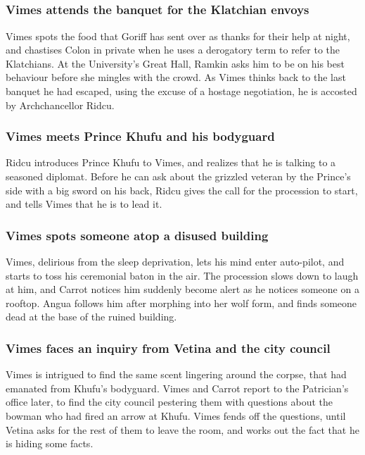 \subsection{}
\subsubsection{\Gls{Vimes} attends the banquet for the Klatchian envoys}
\Gls{Vimes} spots the food that \Gls{Goriff} has sent over as thanks for their help at night, and
chastises \Gls{Colon} in private when he uses a derogatory term to refer to the Klatchians. At the
University's Great Hall, \Gls{Ramkin} asks him to be on his best behaviour before she mingles with
the crowd. As \Gls{Vimes} thinks back to the last banquet he had escaped, using the excuse of a
hostage negotiation, he is accosted by Archchancellor \Gls{Ridcu}.

\subsubsection{\Gls{Vimes} meets Prince \Gls{Khufu} and his bodyguard}
\Gls{Ridcu} introduces Prince \Gls{Khufu} to \Gls{Vimes}, and realizes that he is talking to a
seasoned diplomat. Before he can ask about the grizzled veteran by the Prince's side with a big
sword on his back, \Gls{Ridcu} gives the call for the procession to start, and tells \Gls{Vimes}
that he is to lead it.

\subsubsection{\Gls{Vimes} spots someone atop a disused building}
\Gls{Vimes}, delirious from the sleep deprivation, lets his mind enter auto-pilot, and starts to
toss his ceremonial baton in the air. The procession slows down to laugh at him, and \Gls{Carrot}
notices him suddenly become alert as he notices someone on a rooftop. \Gls{Angua} follows him after
morphing into her wolf form, and finds someone dead at the base of the ruined building.

\subsubsection{\Gls{Vimes} faces an inquiry from \Gls{Vetina} and the city council}
\Gls{Vimes} is intrigued to find the same scent lingering around the corpse, that had emanated
from \Gls{Khufu}'s bodyguard. \Gls{Vimes} and \Gls{Carrot} report to the Patrician's office later,
to find the city council pestering them with questions about the bowman who had fired an arrow at
\Gls{Khufu}. \Gls{Vimes} fends off the questions, until \Gls{Vetina} asks for the rest of them to
leave the room, and works out the fact that he is hiding some facts.

